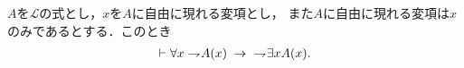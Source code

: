 	\begin{comment}
		必要に応じて$A$を$\lang{\varepsilon}$の式に書き換えたものを$\hat{A}$とする．
		存在記号の推論公理より
		\begin{align}
			\vdash\ \negation A(\varepsilon x \negation \hat{A}(x)) \rarrow \exists x \negation A(x)
		\end{align}
		が成り立つので，対偶を取って
		\begin{align}
			\vdash\ \negation \exists x \negation A(x) \rarrow\ \negation\negation A(\varepsilon x \negation \hat{A}(x))
		\end{align}
		が従い(論理的定理\ref{logicalthm:introduction_of_contraposition})，演繹定理の逆より
		\begin{align}
			\negation \exists x \negation A(x) \vdash\ \negation\negation A(\varepsilon x \negation \hat{A}(x))
		\end{align}
		となる．そして二重否定の除去より
		\begin{align}
			\negation \exists x \negation A(x) \vdash A(\varepsilon x \negation \hat{A}(x))
		\end{align}
		が成立し，全称の導出(論理的定理\ref{derivation_of_universal_by_epsilon})より
		\begin{align}
			\negation \exists x \negation A(x) \vdash \forall x A(x)
		\end{align}
		が従う．演繹定理より
		\begin{align}
			\vdash\ \negation \exists x \negation A(x) \rarrow \forall x A(x)
		\end{align}
		となり，対偶を取れば
		\begin{align}
			\vdash\ \negation \forall x A(x) \rarrow\ \negation\negation \exists x \negation A(x)
		\end{align}
		となるが，先と同様に二重否定の除去によって
		\begin{align}
			\vdash\ \negation \forall x A(x) \rarrow \exists x \negation A(x)
		\end{align}
		が得られる．
		\QED
	\end{comment}
	
	\begin{screen}
		\begin{logicalthm}
		\label{logicalthm:strong_De_Morgan_law_for_quantifiers_1}
			$A$を$\mathcal{L}$の式とし，$x$を$A$に自由に現れる変項とし，
			また$A$に自由に現れる変項は$x$のみであるとする．このとき
			\begin{align}
				\vdash \forall x \rightharpoondown\hspace{-0.25em} A(x) \hspace{0.25em}\rightarrow\hspace{0.25em}\ \rightharpoondown\hspace{-0.25em} \exists x A(x).
			\end{align}
		\end{logicalthm}
	\end{screen}
	
